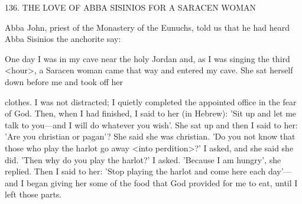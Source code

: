136. THE LOVE OF ABBA SISINIOS
FOR A SARACEN WOMAN

Abba John, priest of the Monastery of the Eunuchs, told us that he
had heard Abba Sisinios the anchorite say:

One day I was in my cave near the holy Jordan and, as I was
singing the third <hour>, a Saracen woman came that way and
entered my cave. She sat herself down before me and took off her

clothes. I was not distracted; I quietly completed the appointed
office in the fear of God. Then, when I had finished, I said to her
(in Hebrew): 'Sit up and let me talk to you—and I will do whatever
you wish'. She sat up and then I said to her: 'Are you christian or
pagan'? She said she was christian. 'Do you not know that those
who play the harlot go away <into perdition>?' I asked, and she
said she did. 'Then why do you play the harlot?' I asked. 'Because
I am hungry', she replied. Then I said to her: 'Stop playing the
harlot and come here each day'—and I began giving her some of the
food that God provided for me to eat, until I left those parts.

